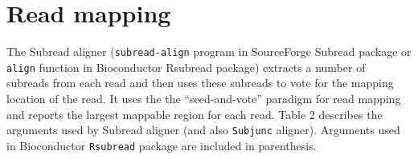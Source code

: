 \documentclass[12pt]{report}
\newcommand{\code}[1]{{\small\texttt{#1}}}
\newcommand{\Subread}{\textsf{Subread}}
\newcommand{\Rsubread}{\textsf{Rsubread}}
\begin{document}
\newpage

\section{Read mapping}

The {\Subread} aligner (\texttt{subread-align} program in SourceForge {\Subread} package or \code{align} function in Bioconductor {\Rsubread} package) extracts a number of subreads from each read and then uses these subreads to vote for the mapping location of the read.
It uses the the ``seed-and-vote'' paradigm for read mapping and reports the largest mappable region for each read.
Table 2 describes the arguments used by {\Subread} aligner (and also \code{Subjunc} aligner).
Arguments used in Bioconductor \code{Rsubread} package are included in parenthesis.\\
\end{document}
